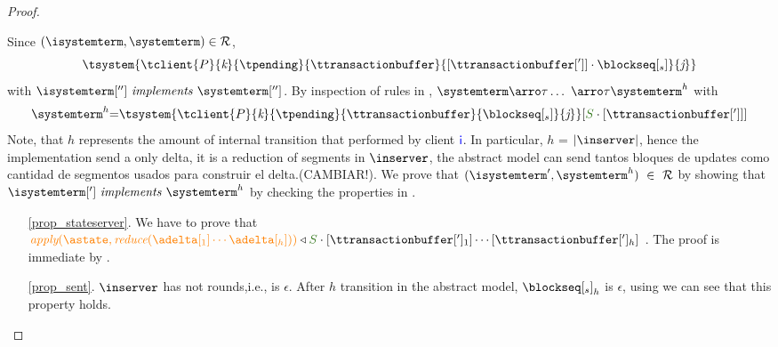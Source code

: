 \begin{proof}
\begin{itemize}
\begin{itemize}
				Since $(\isystemterm,\systemterm)\in \mathcal{R}$,
				\[\tsystem{\tclient{\tprogram}{\tknown}{\tpending}{\ttransactionbuffer}{[\tsenthead] \cdot \tsent}{\treceivebuffer}} \]
				with $\implements{\isystemterm['']}{\systemterm['']}$. By inspection of rules in \figref{}, 
				$\systemterm \arroi{\tau} \ldots\ \arroi{\tau} \systemterm^{h}$ with
				\[\begin{array}{r@{=}l}
					\systemterm^{h} &  \tsystem{\tclient{\tprogram}{\tknown}{\tpending}{\ttransactionbuffer}{\tsent}{\treceivebuffer}}[\queuemessage \cdot [\tsenthead]]
				  \end{array}		
				\]
				Note, that $h$ represents the amount of internal transition that performed by client $\textcolor{blue}{{\sf i}}$. In particular,  $h$ = $|\inserver|$, hence the implementation send a only delta, it is a reduction of segments in $\inserver$, the abstract model can send tantos bloques de updates como cantidad de segmentos usados para construir el delta.(CAMBIAR!). 
				We  prove that $(\isystemterm',\systemterm^{h}) \ \in \ \mathcal{R}$ by showing that $\implements{\isystemterm[']}{\systemterm^{h}}$ 
				by checking the properties in .	
					\begin{enumerate}
							\item[\ref{prop_stateserver}.] We have to prove that 
						$\iapply{\astate}{\ireduce{\adelta[_1]\cdots\adelta[_h]}} \triangleleft \queuemessage\cdot [\tsenthead_1]\cdots[\tsenthead_h] \ $. The proof is immediate by .
						\item[\ref{prop_sent}.] $\inserver$ has not rounds,i.e., is $\epsilon$. After $h$ transition in the abstract model, ${\tsent}_h$ is $\epsilon$, using \triangemptydelta we can see that this property holds.
					\end{enumerate}
	
	
	

\end{itemize}
\end{itemize}
\end{proof}
